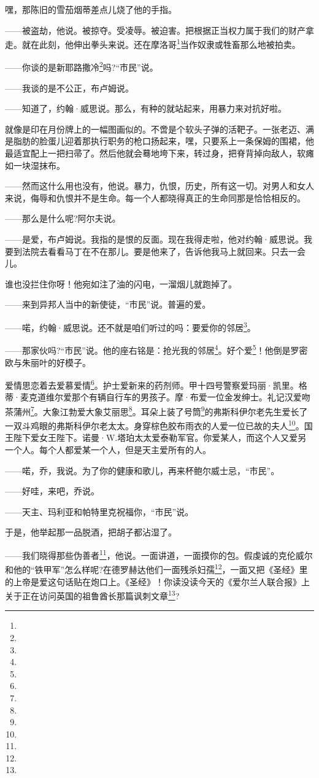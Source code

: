 \par 嘿，那陈旧的雪茄烟蒂差点儿烧了他的手指。
\par ——被盗劫，他说。被掠夺。受凌辱。被迫害。把根据正当权力属于我们的财产拿走。就在此刻，他伸出拳头来说。还在摩洛哥\footnote{}当作奴隶或牲畜那么地被拍卖。
\par ——你谈的是新耶路撒冷\footnote{}吗?“市民”说。
\par ——我谈的是不公正，布卢姆说。
\par ——知道了，约翰·威思说。那么，有种的就站起来，用暴力来对抗好啦。
\par 就像是印在月份牌上的一幅图画似的。不啻是个软头子弹的活靶子。一张老迈、满是脂肪的脸蛋儿迎着那执行职务的枪口扬起来，嘿，只要系上一条保姆的围裙，他最适宜配上一把扫帚了。然后他就会蓦地垮下来，转过身，把脊背掉向敌人，软瘫如一块湿抹布。
\par ——然而这什么用也没有，他说。暴力，仇恨，历史，所有这一切。对男人和女人来说，侮辱和仇恨并不是生命。每一个人都晓得真正的生命同那是恰恰相反的。
\par ——那么是什么呢?阿尔夫说。
\par ——是爱，布卢姆说。我指的是恨的反面。现在我得走啦，他对约翰·威思说。我要到法院去看看马丁在不在那儿。要是他来了，告诉他我马上就回来。只去一会儿。
\par 谁也没拦住你呀！他宛如注了油的闪电，一溜烟儿就跑掉了。
\par ——来到异邦人当中的新使徒，“市民”说。普遍的爱。
\par ——喏，约翰·威思说。还不就是咱们听过的吗：要爱你的邻居\footnote{}。
\par ——那家伙吗?“市民”说。他的座右铭是：抢光我的邻居\footnote{}。好个爱\footnote{}！他倒是罗密欧与朱丽叶的好模子。
\par 爱情思恋着去爱慕爱情\footnote{}。护士爱新来的药剂师。甲十四号警察爱玛丽·凯里。格蒂·麦克道维尔爱那个有辆自行车的男孩子。摩·布爱一位金发绅士。礼记汉爱吻茶蒲州\footnote{}。大象江勃爱大象艾丽思\footnote{}。耳朵上装了号筒\footnote{}的弗斯科伊尔老先生爱长了一双斗鸡眼的弗斯科伊尔老太太。身穿棕色胶布雨衣的人爱一位已故的夫人\footnote{}。国王陛下爱女王陛下。诺曼·W.塔珀太太爱泰勒军官。你爱某人，而这个人又爱另一个人。每个人都爱某一个人，但是天主爱所有的人。
\par ——喏，乔，我说。为了你的健康和歌儿，再来杯鲍尔威士忌，“市民”。
\par ——好哇，来吧，乔说。
\par ——天主、玛利亚和帕特里克祝福你，“市民”说。
\par 于是，他举起那一品脱酒，把胡子都沾湿了。
\par ——我们晓得那些伪善者\footnote{}，他说。一面讲道，一面摸你的包。假虔诚的克伦威尔和他的“铁甲军”怎么样呢?在德罗赫达他们一面残杀妇孺\footnote{}，一面又把《圣经》里的上帝是爱这句话贴在炮口上。《圣经》！你读没读今天的《爱尔兰人联合报》上关于正在访问英国的祖鲁酋长那篇讽刺文章\footnote{}?
